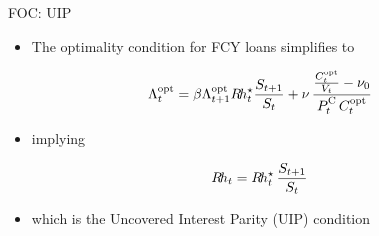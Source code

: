 \begin{frame}{FOC: UIP}
  \begin{itemize}
    \item The optimality condition for FCY loans simplifies to    
  \end{itemize}
  \vspace*{-3ex}
  \begin{align*}
    \Lambda^\opt_t =\beta\Lambda^\opt_{t+1} \Rh^{\star}_t \frac{S_{t+1}}{S_t} + \nu\,\frac{\frac{C^\opt_t}{V_t}-\nu_0}{P^\cc_t\,{C^\opt_t}}
  \end{align*}
  \vspace*{-2ex}
  \begin{itemize}
    \item implying   
  \end{itemize}
  \vspace*{-2ex}
  \begin{align*}
    R\hspace{-0.15em}h_t = R\hspace{-0.15em}h^{\star}_t \, \frac{S_{t+1}}{S_t} 
  \end{align*}
  \vspace*{-2ex}
  \begin{itemize}
    \item which is the Uncovered Interest Parity (UIP) condition
  \end{itemize}
\end{frame} 


      
      